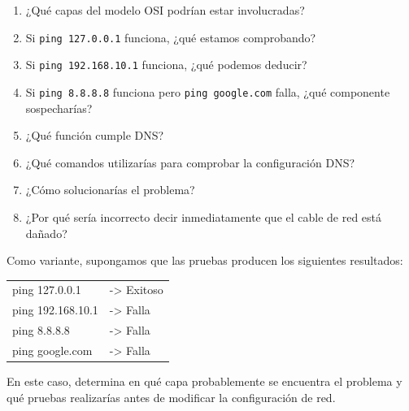 \begin{tcolorbox}[enunciado]
\begin{enumerate}[label=\arabic*., leftmargin=*]
    \item ¿Qué capas del modelo OSI podrían estar involucradas?
    \item Si \texttt{ping 127.0.0.1} funciona, ¿qué estamos comprobando?
    \item Si \texttt{ping 192.168.10.1} funciona, ¿qué podemos deducir?
    \item Si \texttt{ping 8.8.8.8} funciona pero \texttt{ping google.com} falla, ¿qué componente sospecharías?
    \item ¿Qué función cumple DNS?
    \item ¿Qué comandos utilizarías para comprobar la configuración DNS?
    \item ¿Cómo solucionarías el problema?
    \item ¿Por qué sería incorrecto decir inmediatamente que el cable de red está dañado?
\end{enumerate}

Como variante, supongamos que las pruebas producen los siguientes resultados:
\begin{terminal}
\begin{tabular}{ll}
ping 127.0.0.1    & -> Exitoso \\
ping 192.168.10.1 & -> Falla \\
ping 8.8.8.8      & -> Falla \\
ping google.com   & -> Falla
\end{tabular}
\end{terminal}
En este caso, determina en qué capa probablemente se encuentra el problema y qué pruebas realizarías antes de modificar la configuración de red.
\end{tcolorbox}

